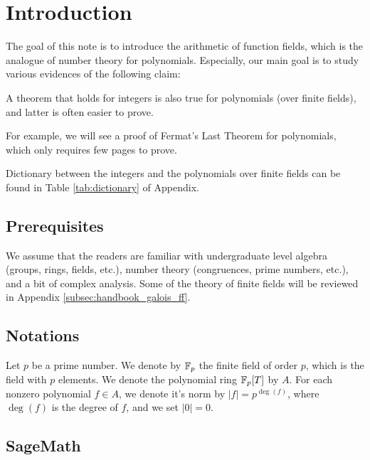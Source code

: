 \section{Introduction}
\label{sec:intro}

The goal of this note is to introduce the arithmetic of function fields, which is the analogue of number theory for polynomials.
Especially, our main goal is to study various evidences of the following claim:

\begin{myquote}
A theorem that holds for integers is also true for polynomials (over finite fields), and latter is often easier to prove.
\end{myquote}
For example, we will see a proof of Fermat's Last Theorem for polynomials, which only requires few pages to prove.

Dictionary between the integers and the polynomials over finite fields can be found in Table \ref{tab:dictionary} of Appendix.

\subsection{Prerequisites}
We assume that the readers are familiar with undergraduate level algebra (groups, rings, fields, etc.), number theory (congruences, prime numbers, etc.), and a bit of complex analysis.
Some of the theory of finite fields will be reviewed in Appendix \ref{subsec:handbook_galois_ff}.


\subsection{Notations}

Let $p$ be a prime number. We denote by $\mathbb{F}_p$ the finite field of order $p$, which is the field with $p$ elements.
We denote the polynomial ring $\mathbb{F}_p[T]$ by $A$.
For each nonzero polynomial $f \in A$, we denote it's norm by $|f| = p^{\deg (f)}$, where $\deg (f)$ is the degree of $f$, and we set $|0| = 0$.

\subsection{SageMath}

